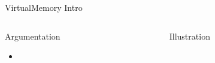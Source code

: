 %
\begin{Frame}{VirtualMemory Intro}
  \begin{columns}[t]
    \begin{column}{\HW} %
      \begin{block}{Argumentation}
        \begin{itemize}
        \item 
        \end{itemize}
      \end{block} 
    \end{column}
    
    \begin{column}{\HW} %
      \begin{block}{Illustration}
      \end{block}   
    \end{column}
  \end{columns}  
\end{Frame}


